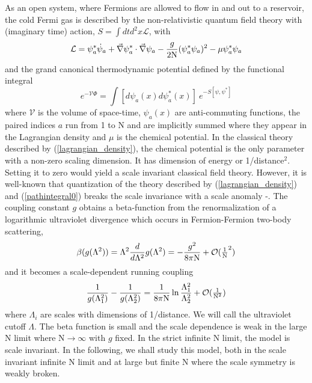 \documentclass[twocolumn,secnumarabic,amssymb, nobibnotes, aps, prd]{revtex4}
\begin{document}
  As an open system, where Fermions are allowed to flow in and out
 to a reservoir, the cold Fermi gas is described by the non-relativistic quantum field theory with 
 (imaginary time) action,  $S=\int dtd^2x{\mathcal L}$, with
 \begin{align}%
{\mathcal L}=
\psi_a^*\dot\psi_a+\vec\nabla\psi_a^*\cdot\vec\nabla\psi_a  
 -\frac{g}{2{\rm N}}(\psi_a^*\psi_a)^2-\mu \psi_a^*\psi_a
\label{lagrangian_density}
\end{align}
and the grand canonical thermodynamic potential defined by the functional integral
\begin{equation}\label{pathintegral0}
 e^{-{\mathcal V}\Phi}=\int [d\psi_a(x) d\psi^*_a(x)] ~e^{-S[\psi,\psi^*] }
\end{equation}
where ${\mathcal V}$ is the volume of space-time, $\psi_a(x)$ are anti-commuting functions, 
 the paired indices $a$ run from 1 to N and are implicitly summed where they appear in the Lagrangian density
 and $\mu$ is the chemical potential.  
In the classical theory described by (\ref{lagrangian_density}), 
the chemical potential  is the only parameter  with  a non-zero  scaling dimension. It has dimension of
energy or 1/distance$^2$.   Setting it to zero would yield a scale invariant classical field theory.  However, 
it is well-known that quantization of the theory  described by (\ref{lagrangian_density}) and (\ref{pathintegral0}) breaks the scale invariance 
with a scale anomaly \cite{anom0}-\cite{an3}. 
The coupling constant $g$ obtains a beta-function \cite{Bergman:1991hf} 
from the renormalization of a logarithmic ultraviolet divergence which occurs
in Fermion-Fermion two-body scattering,  
\begin{align}\label{beta}
\beta(g(\Lambda^2)) = \Lambda^2 \frac{d}{d\Lambda^2}g(\Lambda^2)=-\frac{g^2}{8\pi{\rm  N}}+{\mathcal O}(\tfrac{1}{\rm N}^2) 
\end{align}
 and it becomes a scale-dependent running coupling
 \begin{align}
\frac{1}{g(\Lambda^2_1)}-\frac{1}{g(\Lambda^2_2)}=\frac{1}{8\pi {\rm  N}}\ln\frac{\Lambda^2_1}{\Lambda^2_2}
+{\mathcal O}(\tfrac{1}{{\rm N}^2})
\label{beta1}
\end{align}
where $\Lambda_i$ are scales with dimensions of 1/distance. We will call the ultraviolet cutoff $\Lambda$.   
The beta function is  small and the scale dependence is weak  in the large N  limit where N$\to\infty$ with $g$ fixed.  
In the strict infinite N limit, the model is scale invariant.  In the following, we shall study this model, both in the scale invariant
infinite N limit and at large but finite N where the scale symmetry is weakly broken.
\end{document}
